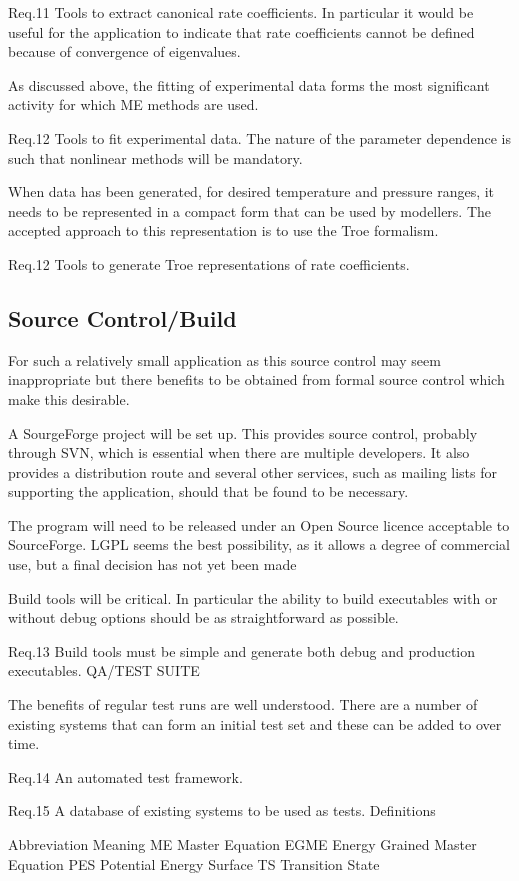 Req.11 Tools to extract canonical rate coefficients. In particular it would be useful for the application to indicate that rate coefficients cannot be defined because of convergence of eigenvalues.

As discussed above, the fitting of experimental data forms the most significant activity for which ME methods are used.

Req.12 Tools to fit experimental data. The nature of the parameter dependence is such that nonlinear methods will be mandatory.

When data has been generated, for desired temperature and pressure ranges, it needs to be represented in a compact form that can be used by modellers. The accepted approach to this representation is to use the Troe formalism.

Req.12 Tools to generate Troe representations of rate coefficients.

\subsection{Source Control/Build
}\label{sec:SourceControlBuild
}

For such a relatively small application as this source control may seem inappropriate but there benefits to be obtained from formal source control which make this desirable.

A SourgeForge project will be set up. This provides source control, probably through SVN, which is essential when there are multiple developers. It also provides a distribution route and several other services, such as mailing lists for supporting the application, should that be found to be necessary.

The program will need to be released under an Open Source licence acceptable to SourceForge. LGPL seems the best possibility, as it allows a degree of commercial use, but a final decision has not yet been made 

Build tools will be critical. In particular the ability to build executables with or without debug options should be as straightforward as possible.

Req.13 Build tools must be simple and generate both debug and production executables.
QA/TEST SUITE

The benefits of regular test runs are well understood. There are a number of existing systems that can form an initial test set and these can be added to over time.

Req.14 An automated test framework.

Req.15 A database of existing systems to be used as tests.
Definitions

Abbreviation	Meaning
ME	Master Equation
EGME	Energy Grained Master Equation
PES	Potential Energy Surface
TS	Transition State
	
	

